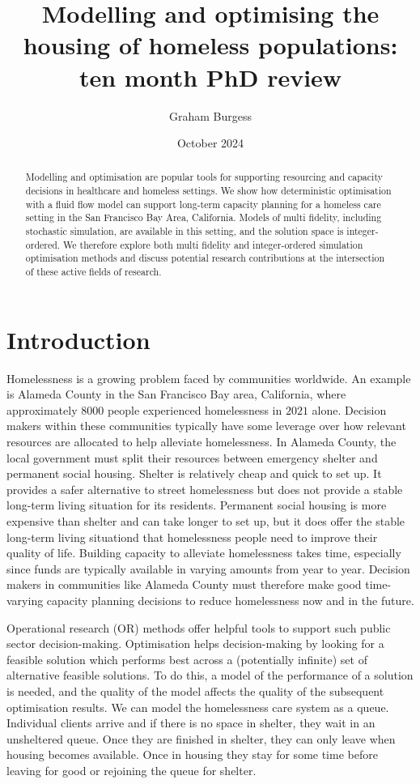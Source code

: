 \documentclass[12pt,a4paper]{article}
\title{Modelling and optimising the housing of homeless populations: ten month PhD review}
\author{Graham Burgess}
\date{October 2024}
\begin{document}
\maketitle

\begin{abstract}
Modelling and optimisation are popular tools for supporting resourcing and capacity decisions in healthcare and homeless settings. We show how deterministic optimisation with a fluid flow model can support long-term capacity planning for a homeless care setting in the San Francisco Bay Area, California. Models of multi fidelity, including stochastic simulation, are available in this setting, and the solution space is integer-ordered. We therefore explore both multi fidelity and integer-ordered simulation optimisation methods and discuss potential research contributions at the intersection of these active fields of research.
\end{abstract}

\section{Introduction}

Homelessness is a growing problem faced by communities worldwide. An example is Alameda County in the San Francisco Bay area, California, where approximately $8000$ people experienced homelessness in $2021$ alone. Decision makers within these communities typically have some leverage over how relevant resources are allocated to help alleviate homelessness. In Alameda County, the local government must split their resources between emergency shelter and permanent social housing. Shelter is relatively cheap and quick to set up. It provides a safer alternative to street homelessness but does not provide a stable long-term living situation for its residents. Permanent social housing is more expensive than shelter and can take longer to set up, but it does offer the stable long-term living situationd that homelessness people need to improve their quality of life. Building capacity to alleviate homelessness takes time, especially since funds are typically available in varying amounts from year to year. Decision makers in communities like Alameda County must therefore make good time-varying capacity planning decisions to reduce homelessness now and in the future.

Operational research (OR) methods offer helpful tools to support such public sector decision-making. Optimisation helps decision-making by looking for a feasible solution which performs best across a (potentially infinite) set of alternative feasible solutions. To do this, a model of the performance of a solution is needed, and the quality of the model affects the quality of the subsequent optimisation results. We can model the homelessness care system as a queue. Individual clients arrive and if there is no space in shelter, they wait in an unsheltered queue. Once they are finished in shelter, they can only leave when housing becomes available. Once in housing they stay for some time before leaving for good or rejoining the queue for shelter. 
\end{document}
